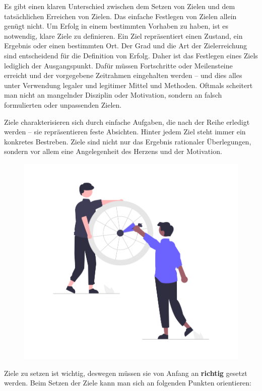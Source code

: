 
Es gibt einen klaren Unterschied zwischen dem Setzen von Zielen und dem tatsächlichen Erreichen von Zielen.
Das einfache Festlegen von Zielen allein genügt nicht. Um Erfolg in einem bestimmten Vorhaben zu haben,
ist es notwendig, klare Ziele zu definieren. Ein Ziel repräsentiert einen Zustand, ein Ergebnis oder einen
bestimmten Ort. Der Grad und die Art der Zielerreichung sind entscheidend für die Definition von Erfolg. Daher
ist das Festlegen eines Ziels lediglich der Ausgangspunkt. Dafür müssen Fortschritte oder Meilensteine
erreicht und der vorgegebene Zeitrahmen eingehalten werden – und dies alles unter Verwendung legaler und
legitimer Mittel und Methoden. Oftmals scheitert man nicht an mangelnder Disziplin oder Motivation, sondern
an falsch formulierten oder unpassenden Zielen.

Ziele charakterisieren sich durch einfache Aufgaben, die nach der Reihe erledigt werden – sie repräsentieren
feste Absichten. Hinter jedem Ziel steht immer ein konkretes Bestreben.
Ziele sind nicht nur das Ergebnis rationaler Überlegungen, sondern vor allem eine Angelegenheit des Herzens
und der Motivation.\cite{ziele}

\begin{figure}[H]
    \centering
    \includegraphics[height=0.45\textwidth]{./pics/undraw_Target_re_fi8j.png}
    \caption{}
\end{figure}

Ziele zu setzen ist wichtig, deswegen müssen sie von Anfang an \textbf{richtig} gesetzt werden. Beim Setzen der Ziele
kann man sich an folgenden Punkten orientieren: \cite{ziele}


